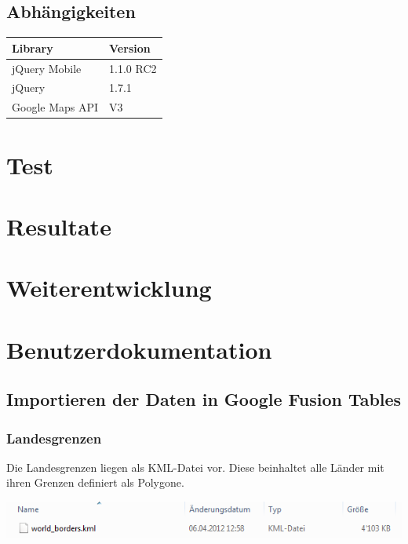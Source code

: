 \subsection{Abhängigkeiten}
\begin{tabular}{|l|l|}
\hline 
Library & Version \\ 
\hline 
jQuery Mobile & 1.1.0 RC2 \\ 
\hline 
jQuery & 1.7.1 \\ 
\hline 
Google Maps API & V3 \\ 
\hline 
\end{tabular} 

\section{Test}

\section{Resultate}

\section{Weiterentwicklung}

\section{Benutzerdokumentation}
\subsection{Importieren der Daten in Google Fusion Tables}
\subsubsection{Landesgrenzen}
Die Landesgrenzen liegen als KML-Datei vor. Diese beinhaltet alle Länder mit ihren Grenzen definiert als Polygone.

\includegraphics{images/usecase1-worlddata/worlddata-worldborders_kml.png}

